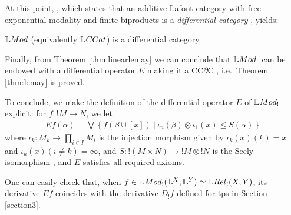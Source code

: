 At this point, \cite[Theorem 21]{LemayCALCO2021}, which states that an additive Lafont category with free exponential modality and finite biproducts is a \emph{differential category} \cite{Blute2006}, yields:
\begin{theorem}\label{thm:linearlemay}
$\Mod$ (equivalently $\GMet$) is a differential category. 
\end{theorem} 
Finally,  from Theorem \ref{thm:linearlemay} we can conclude that $\Mod_{!}$ can be endowed with a differential operator $E$ making it a CC$\partial$C \cite[Proposition 3.2.1]{Blute2009}, i.e.~Theorem \ref{thm:lemay} is proved.

To conclude, we make the definition of the differential operator $E$ of $\Mod_{!}$ explicit: for $f:!M\to N$, we let  
\begin{align}\label{eq:dermod}
Ef(\alpha)=
\bigvee\left\{
f(\beta\cup [x]) \ \Big \vert  \ 
\iota_{n}(\beta)\otimes \iota_{1}(x) \leq S(\alpha)
\right\}
\end{align}
where $\iota_{k}: M_{k}\to \prod_{i\in I}M_{i}$ is the injection morphism given by $\iota_{k}(x)( k)=x$ and $\iota_{k}(x)(i\neq k)=\infty$,
and $S: !(M\times N)\to !M\otimes !N$ is the Seely isomorphism \cite{Mellies2018}, and $E$ satisfies all required axioms.

One can easily check that, when $f\in \Mod_{!}(\Lawv^{X},\Lawv^{Y})\simeq \LREL_{!}(X,Y)$, its derivative $E f$ coincides with the derivative $D_{!}f$ defined for tps in Section \ref{section3}. 

